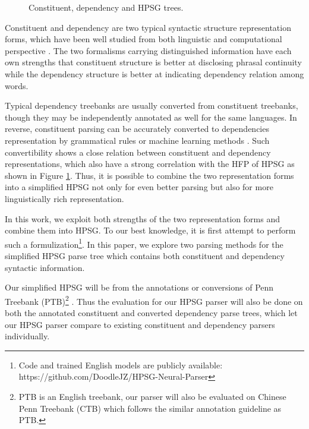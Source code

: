 \documentclass[11pt,a4paper]{article}
\begin{document}
\begin{figure}[t!]
    \centering
    \caption{Constituent, dependency and HPSG trees.}
    \label{fig1}
\end{figure}

Constituent and dependency are two typical syntactic structure representation forms, which have been well studied from both linguistic and computational perspective \cite{chomsky1981lectures, Leeman2001Bresnan}. 
The two formalisms carrying distinguished information have each own strengths that constituent structure is better at disclosing phrasal continuity while the dependency structure is better at indicating dependency relation among words.

Typical dependency treebanks are usually converted from constituent treebanks, though they may be independently annotated as well for the same languages. In reverse, constituent parsing can be accurately converted to dependencies representation by grammatical rules or machine learning methods \cite{Marieffe06generatingtyped,MaW10-4146}. 
Such convertibility shows a close relation between constituent and dependency representations, which also have a strong correlation with the HFP of HPSG as shown in Figure \ref{fig1}. 
Thus, it is possible to combine the two representation forms into a simplified HPSG not only for even better parsing but also for more linguistically rich representation.

In this work, we exploit both strengths of the two representation forms and combine them into HPSG. To our best knowledge, it is first attempt to perform such a formulization\footnote{Code and trained English models are publicly available: https://github.com/DoodleJZ/HPSG-Neural-Parser}.
In this paper, we explore two parsing methods for the simplified HPSG parse tree which contains both constituent and dependency syntactic information. 

Our simplified HPSG will be from the annotations or conversions of Penn Treebank (PTB)\footnote{PTB is an English treebank, our parser will also be evaluated on Chinese Penn Treebank (CTB) which follows the similar annotation guideline as PTB.} \cite{MarcusJ93-2004}. Thus the evaluation for our HPSG parser will also be done on both the annotated constituent and converted dependency parse trees, which let our HPSG parser compare to existing constituent and dependency parsers individually.
\end{document}

